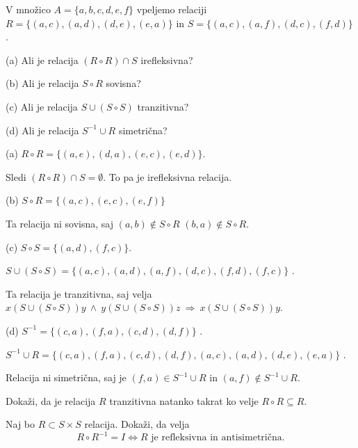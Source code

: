 \documentclass[11pt,paper=b5,footinclude,headinclude]{scrbook} %
\def\inn {{~\wedge~}}
\def\sledi {{~\Rightarrow~}}
\newtheorem{ex}{Vaja\hypertarget{sol:\theex}}[chapter]
\begin{document}
\begin{ex}
V množico $A = \{a, b, c, d, e, f \}$ vpeljemo relaciji
$R = \{(a, c), (a, d), (d, e), (e, a)\}$ in
$S = \{(a, c), (a, f), (d, c), (f, d)\}$ .

(a) Ali je relacija $(R\circ R)\cap S$ irefleksivna?

(b) Ali je relacija $S\circ R$ sovisna?

(c) Ali je relacija $S\cup (S\circ S)$ tranzitivna?

(d) Ali je relacija $S^{-1}\cup R$ simetrična?
\begin{sol}
    
(a)
$R\circ R = \{(a,e), (d,a), (e,c), (e,d)\}$.

Sledi
$(R\circ R)\cap S = \emptyset$. To pa je irefleksivna relacija.

(b) $S\circ R = \{(a,c), (e,c), (e,f)\}$

Ta relacija ni sovisna, saj $(a,b)\not\in S\circ R$
$(b,a)\not\in S\circ R$.

(c)
$S\circ S = \{(a,d), (f,c)\}$.

$S\cup (S\circ S)= \{(a, c), (a,d), (a, f), (d, c), (f, d), (f,c)\}$ .

Ta relacija je tranzitivna, saj velja $x(S\cup (S\circ S))y\inn
y(S\cup (S\circ S))z\sledi x(S\cup (S\circ S))y$.

(d)
$S^{-1} = \{(c, a), (f, a), (c, d), (d, f)\}$ .

$S^{-1}\cup R = \{(c, a), (f, a), (c, d), (d, f),
(a, c), (a, d), (d, e), (e, a)\}$ .

Relacija ni simetrična, saj je $(f,a)\in S^{-1}\cup R$ in $(a,f)\not\in S^{-1}\cup R$.
\end{sol}
\end{ex}

\begin{ex}
    Dokaži, da je relacija $R$ tranzitivna natanko takrat ko velje $R\circ R\subseteq R$.
\end{ex}

\begin{ex}
    Naj bo $R\subset S\times S$ relacija. Dokaži, da velja
    \[
    R\circ R^{-1} =I \iff R \text{ je refleksivna in antisimetrična.}
    \]
\end{ex}
\end{document}

